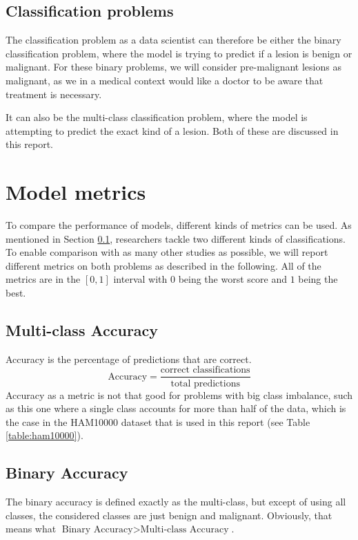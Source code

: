 \subsection{Classification problems}\label{sec:classification-problems}
The classification problem as a data scientist can therefore be either the binary classification problem,
where the model is trying to predict if a lesion is benign or malignant.
For these binary problems, we will consider pre-malignant lesions as malignant,
as we in a medical context would like a doctor to be aware that treatment is necessary.

It can also be the multi-class classification problem,
where the model is attempting to predict the exact kind of a lesion.
Both of these are discussed in this report.

\section{Model metrics} \label{sec:model_metrics}
To compare the performance of models, different kinds of metrics can be used.
As mentioned in Section \ref{sec:classification-problems},
researchers tackle two different kinds of classifications.
To enable comparison with as many other studies as possible,
we will report different metrics
on both problems as described in the following.
All of the metrics are in the $[0, 1]$ interval with $0$ being the worst score and $1$ being the best.

\subsection{Multi-class Accuracy}
Accuracy is the percentage of predictions that are correct.
\[
    \text{Accuracy} = \frac{\text{correct classifications}}{\text{total predictions}}
\]
Accuracy as a metric is not that good for problems with big class imbalance,
such as this one where a single class accounts for more than half of the data,
which is the case in the HAM10000 dataset that is used in this report (see Table \ref{table:ham10000}).

\subsection{Binary Accuracy}
The binary accuracy is defined exactly as the multi-class, but except of using all classes,
the considered classes are just benign and malignant.
Obviously, that means what $\text{Binary Accuracy} > \text{Multi-class Accuracy}$.

